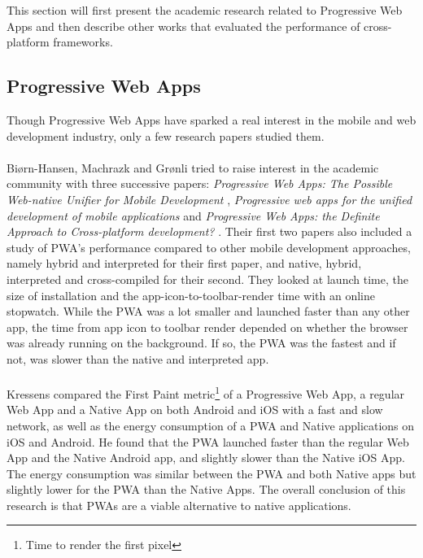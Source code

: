 \documentclass{kththesis}
\begin{document}

This section will first present the academic research related to Progressive Web Apps and then describe other works that evaluated the performance of cross-platform frameworks.

\subsection{Progressive Web Apps}
Though Progressive Web Apps have sparked a real interest in the mobile and web development industry, only a few research papers studied them\cite{PWApossibleUnifer, Biorn-Hansen2, Biorn-Hansen3}.

\paragraph{}
Biørn-Hansen, Machrazk and Grønli tried to raise interest in the academic community with three successive papers: \textit{Progressive Web Apps: The Possible Web-native Unifier for Mobile Development} \cite{PWApossibleUnifer}, \textit{Progressive web apps for the unified development of mobile applications} \cite{Biorn-Hansen2} and \textit{Progressive Web Apps: the Definite Approach to Cross-platform development?} \cite{Biorn-Hansen3}. Their first two papers also included a study of PWA's performance compared to other mobile development approaches, namely hybrid and interpreted for their first paper, and native, hybrid, interpreted and cross-compiled for their second. They looked at launch time, the size of installation and the app-icon-to-toolbar-render time with an online stopwatch. While the PWA was a lot smaller and launched faster than any other app, the time from app icon to toolbar render depended on whether the browser was already running on the background. If so, the PWA was the fastest and if not, was slower than the native and interpreted app. 

\paragraph{}
Kressens \cite{PWAapplicability} compared the First Paint metric\footnote{Time to render the first pixel}  of a Progressive Web App, a regular Web App and a Native App on both Android and iOS with a fast and slow network, as well as the energy consumption of a PWA and Native applications on iOS and Android. He found that the PWA launched faster than the regular Web App and the Native Android app, and slightly slower than the Native iOS App. The energy consumption was similar between the PWA and both Native apps but slightly lower for the PWA than the Native Apps. The overall conclusion of this research is that PWAs are a viable alternative to native applications.
\end{document}
